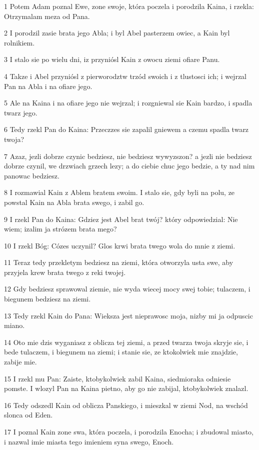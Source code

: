 \par 1 Potem Adam poznal Ewe, zone swoje, która poczela i porodzila Kaina, i rzekla: Otrzymalam meza od Pana.
\par 2 I porodzil zasie brata jego Abla; i byl Abel pasterzem owiec, a Kain byl rolnikiem.
\par 3 I stalo sie po wielu dni, iz przyniósl Kain z owocu ziemi ofiare Panu.
\par 4 Takze i Abel przyniósl z pierworodztw trzód swoich i z tlustosci ich; i wejrzal Pan na Abla i na ofiare jego.
\par 5 Ale na Kaina i na ofiare jego nie wejrzal; i rozgniewal sie Kain bardzo, i spadla twarz jego.
\par 6 Tedy rzekl Pan do Kaina: Przeczzes sie zapalil gniewem a czemu spadla twarz twoja?
\par 7 Azaz, jezli dobrze czynic bedziesz, nie bedziesz wywyzszon? a jezli nie bedziesz dobrze czynil, we drzwiach grzech lezy; a do ciebie chuc jego bedzie, a ty nad nim panowac bedziesz.
\par 8 I rozmawial Kain z Ablem bratem swoim. I stalo sie, gdy byli na polu, ze powstal Kain na Abla brata swego, i zabil go.
\par 9 I rzekl Pan do Kaina: Gdziez jest Abel brat twój? który odpowiedzial: Nie wiem; izalim ja strózem brata mego?
\par 10 I rzekl Bóg: Cózes uczynil? Glos krwi brata twego wola do mnie z ziemi.
\par 11 Teraz tedy przekletym bedziesz na ziemi, która otworzyla usta swe, aby przyjela krew brata twego z reki twojej.
\par 12 Gdy bedziesz sprawowal ziemie, nie wyda wiecej mocy swej tobie; tulaczem, i biegunem bedziesz na ziemi.
\par 13 Tedy rzekl Kain do Pana: Wieksza jest nieprawosc moja, nizby mi ja odpuscic miano.
\par 14 Oto mie dzis wyganiasz z oblicza tej ziemi, a przed twarza twoja skryje sie, i bede tulaczem, i biegunem na ziemi; i stanie sie, ze ktokolwiek mie znajdzie, zabije mie.
\par 15 I rzekl mu Pan: Zaiste, ktobykolwiek zabil Kaina, siedmioraka odniesie pomste. I wlozyl Pan na Kaina pietno, aby go nie zabijal, ktobykolwiek znalazl.
\par 16 Tedy odszedl Kain od oblicza Panskiego, i mieszkal w ziemi Nod, na wschód slonca od Eden.
\par 17 I poznal Kain zone swa, która poczela, i porodzila Enocha; i zbudowal miasto, i nazwal imie miasta tego imieniem syna swego, Enoch.
